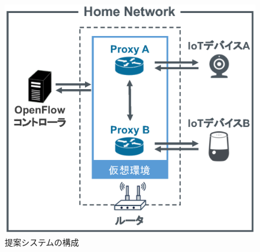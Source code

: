 \documentclass[Japanese]{dicomopapers}
\begin{document}
\begin{figure}[!tb]
      \centering
      \includegraphics[width=\linewidth]{img/system.eps}
      \caption{提案システムの構成}
      \label{fig:system}
\end{figure}
\end{document}
